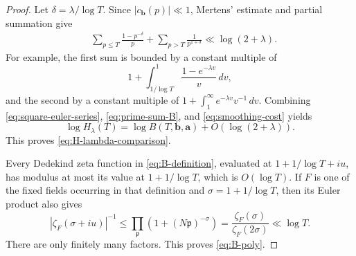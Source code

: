 \documentclass[10pt,a4paper]{amsart}
\renewcommand{\le}{\leqslant}
\begin{document}
\begin{proof}
Let $\delta=\lambda/\log T$.  Since
$|c_{\mathbf b}(p)|\ll1$, Mertens' estimate and partial summation give
\begin{align}
&\sum_{p\le T}\frac{1-p^{-\delta}}p
+\sum_{p>T}\frac1{p^{1+\delta}}
\ll \log(2+\lambda).                                    \label{eq:smoothing-cost}
\end{align}
For example, the first sum is bounded by a constant multiple of
\begin{equation*}
1+\int_{1/\log T}^{1}\frac{1-e^{-\lambda v}}v\,dv,
\end{equation*}
and the second by a constant multiple of
$1+\int_1^\infty e^{-\lambda v}v^{-1}\,dv$.
Combining \eqref{eq:square-euler-series}, \eqref{eq:prime-sum-B}, and
\eqref{eq:smoothing-cost} yields
\begin{equation*}
\log H_\lambda(T)
=\log B(T,\mathbf b,\mathbf a)
+O(\log(2+\lambda)).
\end{equation*}
This proves \eqref{eq:H-lambda-comparison}.

Every Dedekind zeta function in \eqref{eq:B-definition}, evaluated at
$1+1/\log T+iu$, has modulus at most its value at
$1+1/\log T$, which is $O(\log T)$.  If $F$ is one of the fixed fields
occurring in that definition and $\sigma=1+1/\log T$, then its Euler
product also gives
\begin{equation*}
|\zeta_F(\sigma+iu)|^{-1}
\le \prod_{\mathfrak p}\left(1+(N\mathfrak p)^{-\sigma}\right)
=\frac{\zeta_F(\sigma)}{\zeta_F(2\sigma)}
\ll\log T.
\end{equation*}
There are only finitely many factors.  This proves \eqref{eq:B-poly}.
\end{proof}
\end{document}
